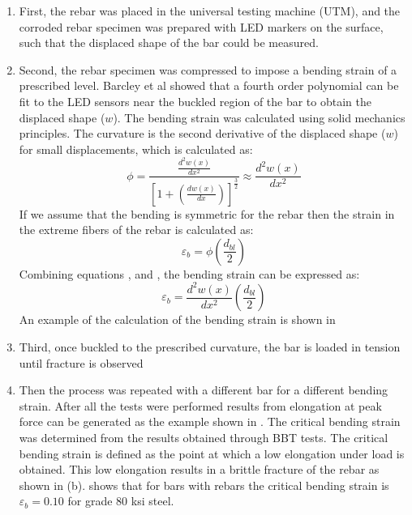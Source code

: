 \begin{enumerate}
    \item First, the rebar was placed in the universal testing machine (UTM), and the corroded rebar specimen was prepared with LED markers on the surface, such that the displaced shape of the bar could be measured.
    \item Second, the rebar specimen was compressed to impose a bending strain of a prescribed level. Barcley et al showed that a fourth order polynomial can be fit to the LED sensors near the buckled region of the bar to obtain the displaced shape ($w$). The bending strain was calculated using solid mechanics principles. The curvature is the second derivative of the displaced shape ($w$) for small displacements, which is calculated as: 
    \begin{equation}
        \phi=\frac{\frac{d^2w(x)}{dx^2}}{\left[1+\left(\frac{dw(x)}{dx}\right)\right]^\frac{3}{2}}\approx \frac{d^2w(x)}{dx^2}
        \label{eq.CuvatureAprox}
    \end{equation}
    If we assume that the bending is symmetric for the rebar then the strain in the extreme fibers of the rebar is calculated as:
    \begin{equation}
        \varepsilon_{b}=\phi\left(\frac{d_{bl}}{2}\right) 
        \label{eq.BendingStrain}
    \end{equation}    
    Combining equations , and , the bending strain can be expressed as:
    \begin{equation}
        \varepsilon_{b}=\frac{d^2w(x)}{dx^2}\left(\frac{d_{bl}}{2}\right) 
        \label{eq.BendingStrainExpanded}
    \end{equation}
    An example of the calculation of the bending strain is shown in 
    \item Third, once buckled to the prescribed curvature, the bar is loaded in tension until fracture is observed
    \item Then the process was repeated with a different bar for a different bending strain. After all the tests were performed results from elongation at peak force can be generated as the example shown in . The critical bending strain was determined from the results obtained through BBT tests. The critical bending strain is defined as the point at which a low elongation under load is obtained. This low elongation results in a brittle fracture of the rebar as shown in (b).  shows that for bars with rebars the critical bending strain is $\varepsilon_{b}=0.10$ for grade 80 ksi steel.
\end{enumerate}

